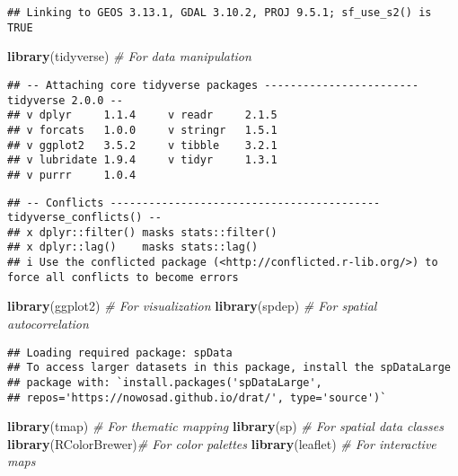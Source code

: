 \documentclass[
]{article}
\newenvironment{Shaded}{\begin{snugshade}}{\end{snugshade}}
\newcommand{\CommentTok}[1]{\textcolor[rgb]{0.56,0.35,0.01}{\textit{#1}}}
\newcommand{\FunctionTok}[1]{\textcolor[rgb]{0.13,0.29,0.53}{\textbf{#1}}}
\newcommand{\NormalTok}[1]{#1}
\begin{document}
\begin{verbatim}
## Linking to GEOS 3.13.1, GDAL 3.10.2, PROJ 9.5.1; sf_use_s2() is TRUE
\end{verbatim}

\begin{Shaded}
\begin{Highlighting}[]
\FunctionTok{library}\NormalTok{(tidyverse)   }\CommentTok{\# For data manipulation}
\end{Highlighting}
\end{Shaded}

\begin{verbatim}
## -- Attaching core tidyverse packages ------------------------ tidyverse 2.0.0 --
## v dplyr     1.1.4     v readr     2.1.5
## v forcats   1.0.0     v stringr   1.5.1
## v ggplot2   3.5.2     v tibble    3.2.1
## v lubridate 1.9.4     v tidyr     1.3.1
## v purrr     1.0.4
\end{verbatim}

\begin{verbatim}
## -- Conflicts ------------------------------------------ tidyverse_conflicts() --
## x dplyr::filter() masks stats::filter()
## x dplyr::lag()    masks stats::lag()
## i Use the conflicted package (<http://conflicted.r-lib.org/>) to force all conflicts to become errors
\end{verbatim}

\begin{Shaded}
\begin{Highlighting}[]
\FunctionTok{library}\NormalTok{(ggplot2)     }\CommentTok{\# For visualization}
\FunctionTok{library}\NormalTok{(spdep)       }\CommentTok{\# For spatial autocorrelation}
\end{Highlighting}
\end{Shaded}

\begin{verbatim}
## Loading required package: spData
## To access larger datasets in this package, install the spDataLarge
## package with: `install.packages('spDataLarge',
## repos='https://nowosad.github.io/drat/', type='source')`
\end{verbatim}

\begin{Shaded}
\begin{Highlighting}[]
\FunctionTok{library}\NormalTok{(tmap)        }\CommentTok{\# For thematic mapping}
\FunctionTok{library}\NormalTok{(sp)          }\CommentTok{\# For spatial data classes}
\FunctionTok{library}\NormalTok{(RColorBrewer)}\CommentTok{\# For color palettes}
\FunctionTok{library}\NormalTok{(leaflet)     }\CommentTok{\# For interactive maps}
\end{Highlighting}
\end{Shaded}
\end{document}
